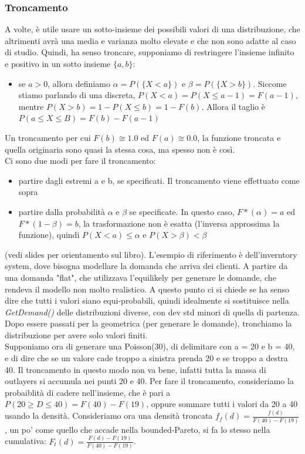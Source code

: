 \documentclass{article}
\begin{document}
\subsubsection{Troncamento}
A volte, è utile usare un sotto-insieme dei possibili valori di una distribuzione, che altrimenti avrà una media e varianza molto elevate e che non sono adatte al caso di studio. Quindi, ha senso troncare, supponiamo di restringere l'insieme infinito e positivo in un sotto insieme $\{a, b\}$:
\begin{itemize}
\item se $a > 0$, allora definiamo $\alpha = P(\{ X < a\})$ e $\beta = P(\{X > b\})$. Siccome stiamo parlando di una discreta, $P(X < a) = P(X \leq a-1) = F(a-1)$, mentre $P(X>b) = 1 - P(X \leq b) = 1 - F(b)$. Allora il taglio è $P(a \leq X \leq B) = F(b) - F(a-1)$
\end{itemize}
Un troncamento per cui $F(b) \cong 1.0$ ed $F(a) \cong 0.0$, la funzione troncata e quella originaria sono quasi la stessa cosa, ma spesso non è così.\\ Ci sono due modi per fare il troncamento:
\begin{itemize}
\item partire dagli estremi a e b, se specificati. Il troncamento viene effettuato come sopra
\item partire dalla probabilità $\alpha$ e $\beta$ se specificate. In questo caso, $F*(\alpha) = a$ ed $F*(1 - \beta) = b$, la trasformazione non è esatta (l'inversa approssima la funzione), quindi $P(X < a)\leq \alpha$ e $P(X > \beta) < \beta$
\end{itemize}
(vedi slides per orientamento sul libro). L'esempio di riferimento è dell'inverntory system, dove bisogna modellare la domanda che arriva dei clienti. A partire da una domanda "flat", che utilizzava l'equilikely per generare le domande, che rendeva il modello non molto realistico. A questo punto ci si chiede se ha senso dire che tutti i valori siano equi-probabili, quindi idealmente si sostituisce nella \textit{GetDemand()} delle distribuzioni diverse, con dev std minori di quella di partenza. Dopo essere passati per la geometrica (per generare le domande), tronchiamo la distribuzione per avere solo valori finiti.\\ Supponiamo ora di generare una Poisson(30), di delimitare con a = 20 e b = 40, e di dire che se un valore cade troppo a sinistra prenda 20 e se troppo a destra 40. Il troncamento in questo modo non va bene, infatti tutta la massa di outlayers si accumula nei punti 20 e 40. Per fare il troncamento, consideriamo la probaiblità di cadere nell'insieme, che è pari a $P(20 \geq D \leq 40) = F(40) - F(19)$, oppure sommare tutti i valori da 20 a 40 usando la densità. Consideriamo ora una densità troncata $f_f(d) = \frac{f(d)}{F(40) - F(19)}$, un po' come quello che accade nella bounded-Pareto, si fa lo stesso nella cumulativa: $F_t(d) = \frac{F(d) - F(19)}{F(40) - F(19)}$.
\end{document}
